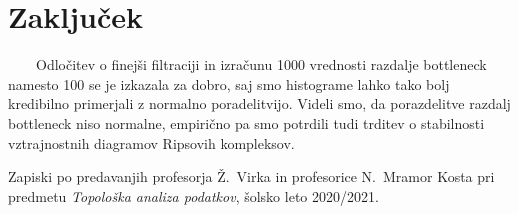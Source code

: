 \documentclass[a4paper,11pt]{article}
\theoremstyle{definition}
\theoremstyle{plain}
\begin{document}
\section{Zaključek}
\ \ \ \ 
Odločitev o finejši filtraciji in izračunu 1000 vrednosti razdalje bottleneck namesto 100 se je izkazala za dobro, saj smo histograme lahko tako bolj kredibilno primerjali z normalno poradelitvijo.
Videli smo, da porazdelitve razdalj bottleneck niso normalne, empirično pa smo potrdili tudi trditev o stabilnosti vztrajnostnih diagramov Ripsovih kompleksov.



\begin{thebibliography}{99}

    Zapiski po predavanjih profesorja Ž.~Virka in profesorice N.~Mramor Kosta pri predmetu \emph{Topološka analiza podatkov}, šolsko leto 2020/2021.
    
\end{thebibliography}
\end{document}
